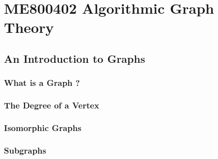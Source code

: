 
\part{ME800402 Algorithmic Graph Theory}

\chapter{An Introduction to Graphs}
\section{What is a Graph ?}
\section{The Degree of a Vertex}
\section{Isomorphic Graphs}
\section{Subgraphs}
